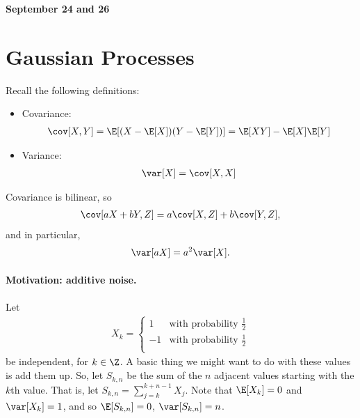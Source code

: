 
\newcommand{\style}{\displaystyle} %

\setlength{\parindent}{0pt} %



\textbf{\Large September 24 and 26}

\section{Gaussian Processes}

Recall the following definitions:
\begin{itemize}

\item Covariance: 
    $$ \begin{aligned}
        \cov[X,Y]=\E[(X-\E[X])(Y-\E[Y])]=\E[XY]-\E[X]\E[Y]
    \end{aligned}$$

\item Variance: 
    $$\begin{aligned}
        \var[X]=\cov[X,X]
    \end{aligned}$$

\end{itemize}

Covariance is bilinear, so 
$$\begin{aligned}
    \cov[aX+bY,Z]=a\cov[X,Z]+b\cov[Y,Z],
\end{aligned}$$
and in particular, 
$$\begin{aligned}
    \var[aX]=a^2\var[X].
\end{aligned}$$


\paragraph{Motivation: additive noise.}

Let 
$$\begin{aligned}
    X_k=\left\{\begin{array}{cc}
        1 &\text{with probability }\frac{1}{2}\\
        -1 & \text{with probability }\frac{1}{2}\\
      \end{array}\right.
\end{aligned}$$
be independent, for $k\in\Z$.  
A basic thing we might want to do with these values is add them up.  
So, let $S_{k,n}$ be the sum of the $n$ adjacent values starting with the $k$th value.  
That is, let $S_{k,n}=\sum_{j=k}^{k+n-1}X_j$.  
Note that $\E[X_k]=0$ and $\var[X_k]=1$, and so $\E[S_{k,n}]=0$, $\var[S_{k,n}]=n$.

